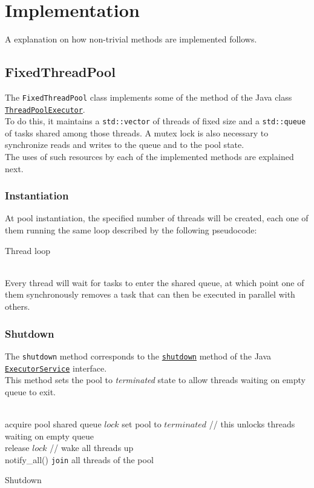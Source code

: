 \documentclass[10pt,twocolumn,letterpaper]{article}
\begin{document}
	\section{Implementation}
	A explanation on how non-trivial methods are implemented follows.
	\subsection{FixedThreadPool}
	The \lstinline|FixedThreadPool| class implements some of the method of the Java class \href{https://docs.oracle.com/javase/7/docs/api/java/util/concurrent/ThreadPoolExecutor.html}{\lstinline|ThreadPoolExecutor|}.\\
	To do this, it maintains a \lstinline|std::vector| of threads of fixed size and a \lstinline|std::queue| of tasks shared among those threads. A mutex lock is also necessary to synchronize reads and writes to the queue and to the pool state.\\
	The uses of such resources by each of the implemented methods are explained next.
	\subsubsection{Instantiation}
	At pool instantiation, the specified number of threads will be created, each one of them running the same loop described by the following pseudocode:
	\begin{algorithm}
		\SetAlgoLined
		\caption{Thread loop}
		\label{pseudo:threads}
	\end{algorithm}\\
	Every thread will wait for tasks to enter the shared queue, at which point one of them synchronously removes a task that can then be executed in parallel with others.
	\subsubsection{Shutdown}
	The \lstinline|shutdown| method corresponds to the  \href{https://docs.oracle.com/javase/7/docs/api/java/util/concurrent/ExecutorService.html#shutdown()}{\lstinline{shutdown}} method of the Java  \href{https://docs.oracle.com/javase/7/docs/api/java/util/concurrent/ExecutorService.html}{\lstinline{ExecutorService}} interface.\\
	This method sets the pool to \textit{terminated} state to allow threads waiting on empty queue to exit.\\\\
	\begin{algorithm}
		\SetAlgoLined
		acquire pool shared queue $lock$\;
		set pool to $terminated$\;
		// this unlocks threads waiting on empty queue\\
		release $lock$\;
		// wake all threads up\\
		notify\_all()\;
		\lstinline|join| all threads of the pool\;
		\caption{Shutdown}
		\label{pseudo:shutdown}
	\end{algorithm}
	\pagebreak
\end{document}
